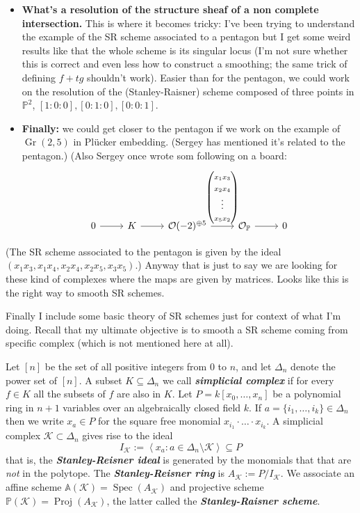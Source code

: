 \begin{itemize}
\item \textbf{What's a resolution of the structure sheaf of a non complete intersection.} This is where it becomes tricky: I've been trying to understand the example of the SR scheme associated to a pentagon but I get some weird results like that the whole scheme is its singular locus (I'm not sure whether this is correct and even less how to construct a smoothing; the same trick of defining \(f+tg\) shouldn't work). Easier than for the pentagon, we could work on the resolution of the (Stanley-Raisner) scheme composed of three points in \(\mathbb{P}^2\), \([1:0:0],[0:1:0],[0:0:1]\).
\item \textbf{Finally:} we could get closer to the pentagon if we work on the example of \(\operatorname{Gr}(2,5)\) in Plücker embedding. (Sergey has mentioned it's related to the pentagon.) (Also Sergey once wrote som following on a board:
	\[\begin{tikzcd}
	0\arrow[r]& K\arrow[r]&\mathcal{O}(-2)^{\oplus 5}\arrow[r,"\begin{pmatrix} x_1x_3\\x_2x_4\\\vdots \\x_5x_2 \end{pmatrix} "]&\mathcal{O}_\mathbb{P}\arrow[r]&0
\end{tikzcd}\]
\end{itemize}
(The SR scheme associated to the pentagon is given by the ideal \((x_1x_3,x_1x_4,x_2x_4,x_2x_5,x_3x_5)\).) Anyway that is just to say we are looking for these kind of complexes where the maps are given by matrices. Looks like this is the right way to smooth SR schemes.

\vspace{1em}
Finally I include some basic theory of SR schemes just for context of what I'm doing. Recall that my ultimate objective is to smooth a SR scheme coming from specific complex (which is not mentioned here at all).

		Let $[n]$ be the set of all positive integers from 0 to $n$, and let $\Delta_n$ denote the power set of $[n]$. A subset $K\subseteq \Delta_n$ we call \textit{\textbf{simplicial complex}} if for every $f\in K$ all the subsets of $f$ are also in $K$. Let $P=k[x_0,\ldots,x_n]$ be a polynomial ring in $n+1$ variables over an algebraically closed field $k$. If $a=\{i_1,\ldots,i_k\} \in\Delta_n$ then we write $x_a\in P$ for the square free monomial $x_{i_1}\cdot \ldots\cdot x_{i_k}$. A simplicial complex $\mathcal{K}\subset \Delta_n$ gives rise to the ideal
		\[I_{\mathcal{K}}:=\left<x_a: a\in\Delta_n\setminus \mathcal{K}\right> \subseteq P\]
		that is, the \textit{\textbf{Stanley-Reisner ideal}} is generated by the monomials that that are \textit{not} in the polytope. The \textit{\textbf{Stanley-Reisner ring}} is $A_{\mathcal{K}}:=P/I_{\mathcal{K}}$. We associate an affine scheme $\mathbb{A}(\mathcal{K}) =\operatorname{Spec}(A_{\mathcal{K}})$ and projective scheme $\mathbb{P}(\mathcal{K})=\operatorname{Proj}(A_{\mathcal{K}})$, the latter called the \textit{\textbf{Stanley-Raisner scheme}}.



